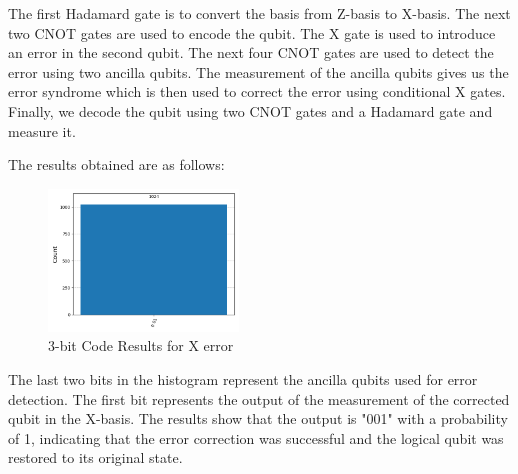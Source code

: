 \documentclass[conference]{IEEEtran}
\begin{document}
The first Hadamard gate is to convert the basis from Z-basis to X-basis. The next two CNOT gates are used to encode the qubit. The X gate is used to introduce an error in the second qubit. The next four CNOT gates are used to detect the error using two ancilla qubits. The measurement of the ancilla qubits gives us the error syndrome which is then used to correct the error using conditional X gates. Finally, we decode the qubit using two CNOT gates and a Hadamard gate and measure it. 

The results obtained are as follows:
\begin{figure}[h]
    \centering
    \includegraphics[width=0.45\textwidth]{../Codes/results/3bitCode/3bitCodeHistogram.png}
    \caption{3-bit Code Results for X error}
    \label{fig:3bitCodeResults} 
\end{figure}

The last two bits in the histogram represent the ancilla qubits used for error detection. The first bit represents the output of the measurement of the corrected qubit in the X-basis. The results show that the output is "001" with a probability of 1, indicating that the error correction was successful and the logical qubit was restored to its original state. 
\end{document}
